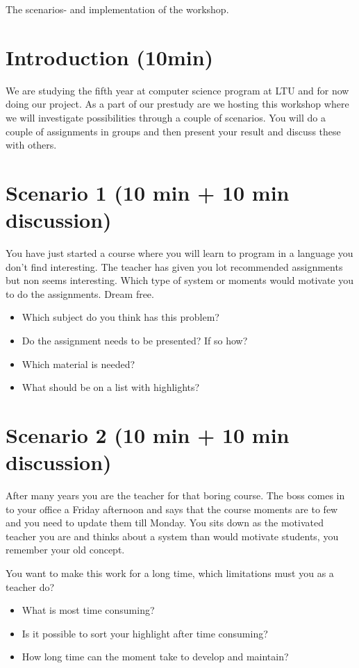 The scenarios- and implementation of the workshop.

\section*{Introduction (10min)}
We are studying the fifth year at computer science program at LTU and for now doing our project. As a part of our prestudy are we hosting this workshop where we will investigate possibilities through a couple of scenarios. You will do a couple of assignments in groups and then present your result and discuss these with others.

\section*{Scenario 1 (10 min + 10 min discussion)}
You have just started a course where you will learn to program in a language you don't find interesting. The teacher has given you lot recommended assignments but non seems interesting. Which type of system or moments would motivate you to do the assignments. Dream free.
\begin{itemize}
\item Which subject do you think has this problem?
\item Do the assignment needs to be presented? If so how?
\item Which material is needed?
\item What should be on a list with highlights?
\end{itemize} 

\section*{Scenario 2 (10 min + 10 min discussion)}
After many years you are the teacher for that boring course. The boss comes in to your office a Friday afternoon and says that the course moments are to few and you need to update them till Monday. You sits down as the motivated teacher you are and thinks about a system than would motivate students, you remember your old concept.

You want to make this work for a long time, which limitations must you as a teacher do?
\begin{itemize}
\item What is most time consuming?
\item Is it possible to sort your highlight after time consuming?
\item How long time can the moment take to develop and maintain?
\end{itemize} 

